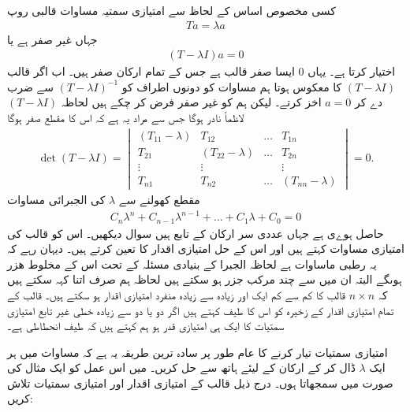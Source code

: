 کسی مخصوص اساس کے لحاظ سے امتیازی سمتیہ مساوات قالبی روپ 
\begin{align}
	Ta = \lambda a
\end{align}
جہاں  غیر صفر ہے یا
\begin{align}
	(T-\lambda I)a = \num{0}
\end{align}
اختیار کرتا ہے۔ یہاں \num{0} ایسا صفر قالب ہے جس کے تمام ارکان صفر ہیں۔ اب اگر قالب \((T-\lambda I)\) کا معکوس ہوتا ہم مساوات  کو دونوں اطراف کو \((T-\lambda I)^{-1}\) سے ضرب دے کر \(a=0\) اخز کرتے۔ لیکن ہم  کو غیر صفر فرض کر چکے ہیں لحاظہ \((T-\lambda I)\) لاظماً نادر ہوگا جس سے مراد یہ ہے کہ اس کا مقطع صفر ہوگا
\begin{align}
	\det(T-\lambda I)=
	\begin{vmatrix}
		(T_{11}-\lambda) & T_{12} & \dots & T_{1n}\\
		T_{21} & (T_{22}-\lambda) & \dots & T_{2n}\\
		\vdots & \vdots & & \vdots\\
		T_{n1} & T_{n2} & \dots & (T_{nn}-\lambda)
	\end{vmatrix}
		= 0.
\end{align}
مقطع کھولنے سے \(\lambda\) کی الجبرائی مساوات
\begin{align}
	C_n\lambda^{n}+C_{n-1}\lambda^{n-1}+\dots+C_1\lambda+C_0 = 0
\end{align}
حاصل ہوےی ہے جہاں عددی سر  ارکان  کے تابع ہیں سوال  دیکھیں۔ اس کو قالب کی امتیازی مساوات کہتے ہیں اور اس کے حل امتیازی اقدار کا تعین کرتے ہیں۔ دیہان رہے کہ یہ  رطبی ماساوات ہے لحاظہ الجبرا کے بنیادی مسئلہ کے تحت اس کے  مخلوط ھزر ہوںگے البتہ ان میں سے چند مرکب جزر ہو سکتے ہیں لحاظہ ہم صرف اتنا کہہ سکتے ہیں کہ \(n \times n\) قالب کا کم سے کم ایک اور زیادہ سے زیادہ  منفرد امتیازی اقدار ہو سکتے ہیں۔ قالب کے تمام امتیازی اقدار کے زخیرہ کو اس کا طیف کہتے ہیں اگر دو یا دو سے زیادہ خطی غیر تابع امتیازی سمتیات کا ایک ہی امتیازی قدر ہو ہم کہتے ہیں کہ طیف انحطاطی ہے۔

امتیازی سمتیات تیار کرنے کا عام طور پر سادہ ترین طریقہ یہ ہے کہ مساوات  میں ہر ایک \(\lambda\) ڈال کر  کے ارکان کے لیئے ہاتھ سے حل کریں۔ میں اس عمل کو ایک مثال کی صورت میں سمجھاتا ہوں۔
درج ذیل قالب کے امتیازی اقدار اور امتیازی سمتیات تلاش کریں:

